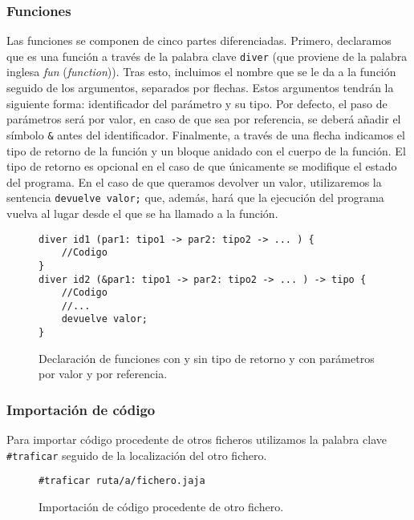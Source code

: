 \subsubsection{Funciones}
Las funciones se componen de cinco partes diferenciadas. Primero, declaramos que
es una función a través de la palabra clave \lstinline{diver} (que proviene de
la palabra inglesa \textit{fun} (\textit{function})). Tras esto, incluimos el
nombre que se le da a la función seguido de los argumentos, separados por
flechas. Estos argumentos tendrán la siguiente forma: identificador del
parámetro y su tipo. Por defecto, el paso de parámetros será por valor, en caso
de que sea por referencia, se deberá añadir el símbolo \lstinline{&} antes del
identificador. Finalmente, a través de una flecha indicamos el tipo de retorno
de la función y un bloque anidado con el cuerpo de la función. El tipo de
retorno es opcional en el caso de que únicamente se modifique el estado del
programa. En el caso de que queramos devolver un valor, utilizaremos la
sentencia \lstinline{devuelve valor;} que, además, hará que la ejecución del
programa vuelva al lugar desde el que se ha llamado a la función.
\begin{figure}[htbp]
    \centering
    \begin{lstlisting}
diver id1 (par1: tipo1 -> par2: tipo2 -> ... ) {
    //Codigo
}
diver id2 (&par1: tipo1 -> par2: tipo2 -> ... ) -> tipo {
    //Codigo
    //...
    devuelve valor;
}
    \end{lstlisting}
    \caption{Declaración de funciones con y sin tipo de retorno y con parámetros
    por valor y por referencia.}
\end{figure}

\subsubsection{Importación de código}
Para importar código procedente de otros ficheros utilizamos la palabra clave
\lstinline{#traficar} seguido de la localización del otro fichero.
\begin{figure}[htbp]
    \centering
    \begin{lstlisting}
#traficar ruta/a/fichero.jaja
    \end{lstlisting}
    \caption{Importación de código procedente de otro fichero.}
\end{figure}

